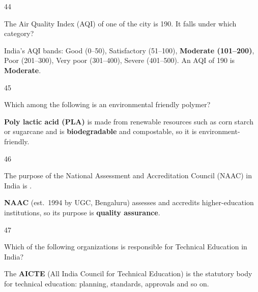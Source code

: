 \begin{question}{44}
{The Air Quality Index (AQI) of one of the city is 190. It falls under which category?\par}
\begin{explain}
India's AQI bands: Good (0--50), Satisfactory (51--100), \textbf{Moderate (101--200)}, Poor (201--300), Very poor (301--400), Severe (401--500). An AQI of 190 is \textbf{Moderate}.
\end{explain}
\end{question}

\begin{question}{45}
{Which among the following is an environmental friendly polymer?\par}
\begin{explain}
\textbf{Poly lactic acid (PLA)} is made from renewable resources such as corn starch or sugarcane and is \textbf{biodegradable} and compostable, so it is environment-friendly.
\end{explain}
\end{question}

\begin{question}{46}
{The purpose of the National Assessment and Accreditation Council (NAAC) in India is \blank{}.\par}
\begin{explain}
\textbf{NAAC} (est.~1994 by UGC, Bengaluru) assesses and accredits higher-education institutions, so its purpose is \textbf{quality assurance}.
\end{explain}
\end{question}

\begin{question}{47}
{Which of the following organizations is responsible for Technical Education in India?\par}
\begin{explain}
The \textbf{AICTE} (All India Council for Technical Education) is the statutory body for technical education: planning, standards, approvals and so on.
\end{explain}
\end{question}

